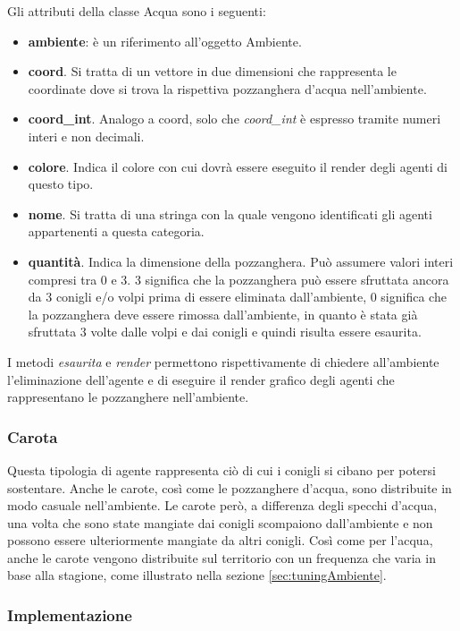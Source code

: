 \documentclass[11pt]{article}
\begin{document}
Gli attributi della classe Acqua sono i seguenti:
\begin{itemize}
    \item \textbf{ambiente}: è un riferimento all'oggetto Ambiente. 
    \item \textbf{coord}. Si tratta di un vettore in due dimensioni che rappresenta le coordinate dove si trova la rispettiva pozzanghera d'acqua nell'ambiente. 
    \item \textbf{coord\_int}. Analogo a coord, solo che \emph{coord\_int} è espresso tramite numeri interi e non decimali. 
    \item \textbf{colore}. Indica il colore con cui dovrà essere eseguito il render degli agenti di questo tipo.
    \item \textbf{nome}. Si tratta di una stringa con la quale vengono identificati gli agenti appartenenti a questa categoria. 
    \item \textbf{quantità}. Indica la dimensione della pozzanghera. Può assumere valori interi compresi tra 0 e 3. 3 significa che la pozzanghera può essere sfruttata ancora da 3 conigli e/o volpi prima di essere eliminata dall'ambiente, 0 significa che la pozzanghera deve essere rimossa dall'ambiente, in quanto è stata già sfruttata 3 volte dalle volpi e dai conigli e quindi risulta essere esaurita. 
\end{itemize}

I metodi \emph{esaurita} e \emph{render} permettono rispettivamente di chiedere all'ambiente l'eliminazione dell'agente e di eseguire il render grafico degli agenti che rappresentano le pozzanghere nell'ambiente. 



\subsubsection{Carota}
Questa tipologia di agente rappresenta ciò di cui i conigli si cibano per potersi sostentare. Anche le carote, così come le pozzanghere d'acqua, sono distribuite in modo casuale nell'ambiente. Le carote però, a differenza degli specchi d'acqua, una volta che sono state mangiate dai conigli scompaiono dall'ambiente e non possono essere ulteriormente mangiate da altri conigli. Così come per l'acqua, anche le carote vengono distribuite sul territorio con un frequenza che varia in base alla stagione, come illustrato nella sezione \ref{sec:tuningAmbiente}. 

\subsubsection{Implementazione}
\end{document}
